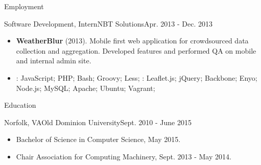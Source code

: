 \documentclass[]{mcdowellcv}
\begin{document}
\begin{cvsection}{Employment}
        \begin{cvsubsection}{Software Development, Intern}{NBT Solutions}{Apr. 2013 - Dec. 2013}
            \begin{itemize}
                \item \textbf{WeatherBlur} (2013). Mobile first web application for crowdsourced data collection and aggregation. Developed features and performed QA on mobile and internal admin site.
            \end{itemize}
            \begin{itemize}
                 \item {}:  JavaScript; PHP;  Bash; Groovy; Less;\newline
                : Leaflet.js; jQuery; Backbone; Enyo; Node.js; MySQL; Apache; Ubuntu; Vagrant;
            \end{itemize}
        \end{cvsubsection}

    \end{cvsection}

    \begin{cvsection}{Education}
        \begin{cvsubsection}{Norfolk, VA}{Old Dominion University}{Sept. 2010 - June 2015}
            \begin{itemize}
                \item  Bachelor of Science in Computer Science, May 2015.
                \item Chair Association for Computing Machinery, Sept. 2013 - May 2014.
            \end{itemize}
        \end{cvsubsection}
    \end{cvsection}
\end{document}
